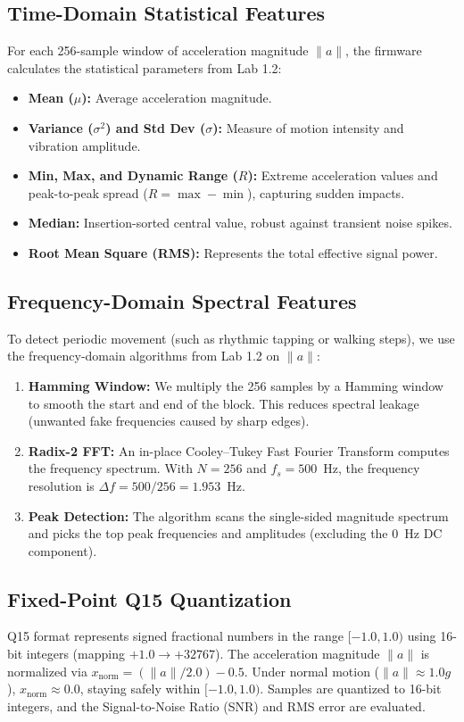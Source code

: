 \documentclass[conference]{IEEEtran}
\begin{document}
\subsection{Time-Domain Statistical Features}
For each 256-sample window of acceleration magnitude $\|a\|$, the firmware calculates the statistical parameters from Lab 1.2:
\begin{itemize}
    \item \textbf{Mean ($\mu$):} Average acceleration magnitude.
    \item \textbf{Variance ($\sigma^2$) and Std Dev ($\sigma$):} Measure of motion intensity and vibration amplitude.
    \item \textbf{Min, Max, and Dynamic Range ($R$):} Extreme acceleration values and peak-to-peak spread ($R = \max - \min$), capturing sudden impacts.
    \item \textbf{Median:} Insertion-sorted central value, robust against transient noise spikes.
    \item \textbf{Root Mean Square (RMS):} Represents the total effective signal power.
\end{itemize}

\subsection{Frequency-Domain Spectral Features}
To detect periodic movement (such as rhythmic tapping or walking steps), we use the frequency-domain algorithms from Lab 1.2 on $\|a\|$:
\begin{enumerate}
    \item \textbf{Hamming Window:} We multiply the 256 samples by a Hamming window to smooth the start and end of the block. This reduces spectral leakage (unwanted fake frequencies caused by sharp edges).
    \item \textbf{Radix-2 FFT:} An in-place Cooley--Tukey Fast Fourier Transform computes the frequency spectrum. With $N=256$ and $f_s=500$~Hz, the frequency resolution is $\Delta f = 500 / 256 = 1.953$~Hz.
    \item \textbf{Peak Detection:} The algorithm scans the single-sided magnitude spectrum and picks the top peak frequencies and amplitudes (excluding the 0~Hz DC component).
\end{enumerate}

\subsection{Fixed-Point Q15 Quantization}
Q15 format represents signed fractional numbers in the range $[-1.0, 1.0)$ using 16-bit integers (mapping $+1.0 \rightarrow +32767$). The acceleration magnitude $\|a\|$ is normalized via $x_{\text{norm}} = (\|a\| / 2.0) - 0.5$. Under normal motion ($\|a\| \approx 1.0g$), $x_{\text{norm}} \approx 0.0$, staying safely within $[-1.0, 1.0)$. Samples are quantized to 16-bit integers, and the Signal-to-Noise Ratio (SNR) and RMS error are evaluated.
\end{document}
